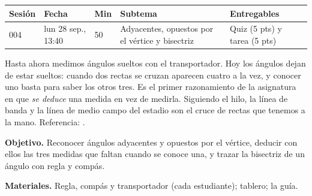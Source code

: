 \documentclass[11pt]{article}
\begin{document}
\encabezado*

\begin{center}
{\renewcommand{\arraystretch}{1.3}
\begin{tabularx}{\linewidth}{@{}l l l X l@{}}
  \toprule
  \textbf{Sesión} & \textbf{Fecha} & \textbf{Min} & \textbf{Subtema} & \textbf{Entregables}\\
  \midrule
  004 & lun 28 sep., 13:40 & 50 & Adyacentes, opuestos por el vértice y bisectriz
      & Quiz (5 pts) y tarea (5 pts)\\
  \bottomrule
\end{tabularx}}
\end{center}

Hasta ahora medimos ángulos sueltos con el transportador. Hoy los ángulos dejan de estar
sueltos: cuando dos rectas se cruzan aparecen cuatro a la vez, y conocer uno basta para saber
los otros tres. Es el primer razonamiento de la asignatura en que \emph{se deduce} una medida
en vez de medirla. Siguiendo el hilo, la línea de banda y la línea de medio campo del estadio
son el cruce de rectas que tenemos a la mano. Referencia: .


\textbf{Objetivo.} Reconocer ángulos adyacentes y opuestos por el vértice, deducir con ellos
las tres medidas que faltan cuando se conoce una, y trazar la bisectriz de un ángulo con regla
y compás.

\textbf{Materiales.} Regla, compás y transportador (cada estudiante); tablero; la guía.
\end{document}
